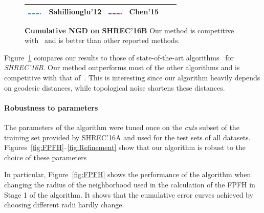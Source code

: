 \begin{figure}[ht!]
\begin{tabular}{|cccccc|}
		\includegraphics[width=0.7cm]{figures/dashed_blue.png} & \small{Sahilliouglu'12\cite{sahilliouglu2012minimum}} &
		\includegraphics[width=0.7cm]{figures/dashedpurple.png} & \small{Chen'15\cite{chen2015robust}} & &
		\\
		\hline
	\end{tabular}
	\caption{{\textbf{Cumulative NGD on SHREC'16B}}
		Our method is competitive with~\cite{vestner2017efficient} and is better than other reported methods.
	}
	\label{fig:Shrec16Top}
\end{figure}


Figure~\ref{fig:Shrec16Top} compares our results to those of state-of-the-art algorithms~\cite{chen2015robust,cosmo2016shrec,litany2017fully,Rodola:2014:DNS:2679600.2679987,rodola2017partial,sahilliouglu2012scale,vestner2017efficient} for {\em SHREC'16B}.
Our method outperforms most of the other algorithms and is competitive with that of~\cite{vestner2017efficient}.
This is interesting since our algorithm heavily depends on geodesic distances, while topological noise shortens these distances.

\paragraph{Robustness to parameters}
The parameters of the algorithm were tuned once on the {\em cuts} subset of the training set provided by SHREC'16A and used for the test sets of all datasets.
Figures~\ref{fig:FPFH}--\ref{fig:Refinement} show that our algorithm is robust to the choice of these parameters

In particular, Figure~\ref{fig:FPFH} shows the performance of the algorithm when changing the radius of the neighborhood used in the calculation of the  FPFH in Stage 1 of the algorithm.
It shows that the cumulative error curves achieved by choosing different radii hardly change.


